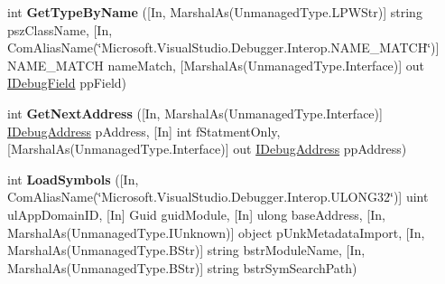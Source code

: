 \begin{DoxyCompactItemize}
\item 
\hypertarget{interface_microsoft_1_1_visual_studio_1_1_debugger_1_1_interop_e_e_1_1_i_debug_com_plus_symbol_provider_a60cfe648181b8ca2d145523e96c65eb4}{int {\bfseries Get\+Type\+By\+Name} (\mbox{[}In, Marshal\+As(Unmanaged\+Type.\+L\+P\+W\+Str)\mbox{]} string psz\+Class\+Name, \mbox{[}In, Com\+Alias\+Name(\char`\"{}Microsoft.\+Visual\+Studio.\+Debugger.\+Interop.\+N\+A\+M\+E\+\_\+\+M\+A\+T\+C\+H\char`\"{})\mbox{]} N\+A\+M\+E\+\_\+\+M\+A\+T\+C\+H name\+Match, \mbox{[}Marshal\+As(Unmanaged\+Type.\+Interface)\mbox{]} out \hyperlink{interface_microsoft_1_1_visual_studio_1_1_debugger_1_1_interop_e_e_1_1_i_debug_field}{I\+Debug\+Field} pp\+Field)}\label{interface_microsoft_1_1_visual_studio_1_1_debugger_1_1_interop_e_e_1_1_i_debug_com_plus_symbol_provider_a60cfe648181b8ca2d145523e96c65eb4}

\item 
\hypertarget{interface_microsoft_1_1_visual_studio_1_1_debugger_1_1_interop_e_e_1_1_i_debug_com_plus_symbol_provider_a879280e7e6cded17162c9ef7a04b67f4}{int {\bfseries Get\+Next\+Address} (\mbox{[}In, Marshal\+As(Unmanaged\+Type.\+Interface)\mbox{]} \hyperlink{interface_microsoft_1_1_visual_studio_1_1_debugger_1_1_interop_e_e_1_1_i_debug_address}{I\+Debug\+Address} p\+Address, \mbox{[}In\mbox{]} int f\+Statment\+Only, \mbox{[}Marshal\+As(Unmanaged\+Type.\+Interface)\mbox{]} out \hyperlink{interface_microsoft_1_1_visual_studio_1_1_debugger_1_1_interop_e_e_1_1_i_debug_address}{I\+Debug\+Address} pp\+Address)}\label{interface_microsoft_1_1_visual_studio_1_1_debugger_1_1_interop_e_e_1_1_i_debug_com_plus_symbol_provider_a879280e7e6cded17162c9ef7a04b67f4}

\item 
\hypertarget{interface_microsoft_1_1_visual_studio_1_1_debugger_1_1_interop_e_e_1_1_i_debug_com_plus_symbol_provider_a0301e127aec7e48b7c62b86200d3e509}{int {\bfseries Load\+Symbols} (\mbox{[}In, Com\+Alias\+Name(\char`\"{}Microsoft.\+Visual\+Studio.\+Debugger.\+Interop.\+U\+L\+O\+N\+G32\char`\"{})\mbox{]} uint ul\+App\+Domain\+I\+D, \mbox{[}In\mbox{]} Guid guid\+Module, \mbox{[}In\mbox{]} ulong base\+Address, \mbox{[}In, Marshal\+As(Unmanaged\+Type.\+I\+Unknown)\mbox{]} object p\+Unk\+Metadata\+Import, \mbox{[}In, Marshal\+As(Unmanaged\+Type.\+B\+Str)\mbox{]} string bstr\+Module\+Name, \mbox{[}In, Marshal\+As(Unmanaged\+Type.\+B\+Str)\mbox{]} string bstr\+Sym\+Search\+Path)}\label{interface_microsoft_1_1_visual_studio_1_1_debugger_1_1_interop_e_e_1_1_i_debug_com_plus_symbol_provider_a0301e127aec7e48b7c62b86200d3e509}


\end{DoxyCompactItemize}
